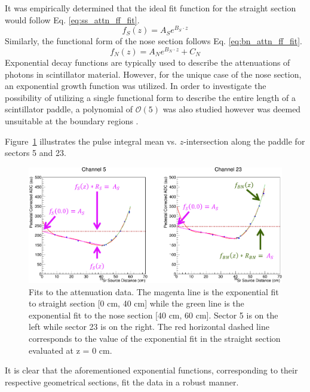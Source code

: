 It was empirically determined that the ideal fit function for the straight section would follow Eq. \ref{eq:ss_attn_ff_fit}.
	\begin{equation} \label{eq:ss_attn_ff_fit}
		f_{S}(z) = A_{S}e^{B_{S} \cdot z}
	\end{equation}
Similarly, the functional form of the nose section follows Eq. \ref{eq:bn_attn_ff_fit}.
	\begin{equation} \label{eq:bn_attn_ff_fit}
		f_{N}(z) = A_{N}e^{B_{N} \cdot z} + C_{N}
	\end{equation}
Exponential decay functions are typically used to describe the attenuations of photons in scintillator material.  However, for the unique case of the nose section, an exponential growth function was utilized.  In order to investigate the possibility of utilizing a single functional form to describe the entire length of a scintillator paddle, a polynomial of $\mathcal{O}(5)$ was also studied however was deemed unsuitable at the boundary regions \cite{pooser16}.

Figure~\ref{fig:attfits} illustrates the pulse integral mean vs. $z$-intersection along the paddle for sectors 5 and 23.  
\begin{figure}[!htb]
	\centering
	\includegraphics[width=1.0\columnwidth]{calibration/figs/attn_fits}
	\caption{Fits to the attenuation data.  The magenta line is the exponential fit to straight section [0 cm, 40 cm] while the green line is the exponential fit to the nose section [40 cm, 60 cm].  Sector 5 is on the left while sector 23 is on the right.  The red horizontal dashed line corresponds to the value of the exponential fit in the straight section evaluated at z = 0 cm.}
	\label{fig:attfits}
\end{figure}
It is clear that the aforementioned exponential functions, corresponding to their respective geometrical sections, fit the data in a robust manner. 

